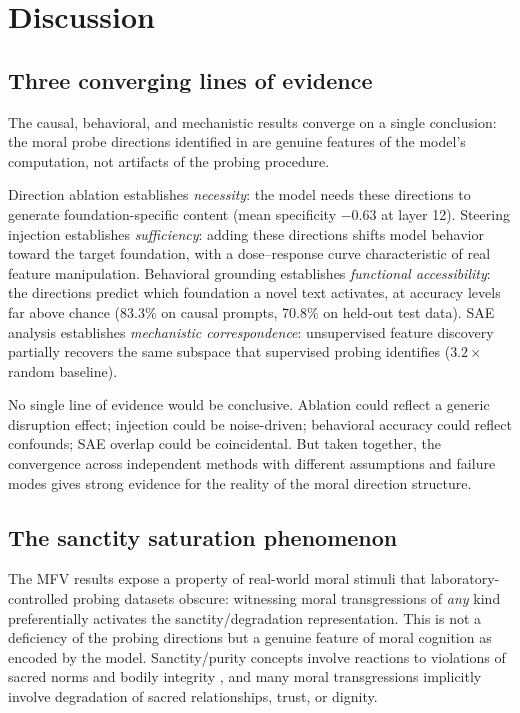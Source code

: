 \section{Discussion}\label{discussion}

\subsection{Three converging lines of evidence}\label{three-converging-lines-of-evidence}

The causal, behavioral, and mechanistic results converge on a single conclusion: the moral probe directions identified in \citet{reblitzrichardson2026geometry} are genuine features of the model's computation, not artifacts of the probing procedure.

Direction ablation establishes \emph{necessity}: the model needs these directions to generate foundation-specific content (mean specificity \(-0.63\) at layer 12).
Steering injection establishes \emph{sufficiency}: adding these directions shifts model behavior toward the target foundation, with a dose--response curve characteristic of real feature manipulation.
Behavioral grounding establishes \emph{functional accessibility}: the directions predict which foundation a novel text activates, at accuracy levels far above chance (83.3\% on causal prompts, 70.8\% on held-out test data).
SAE analysis establishes \emph{mechanistic correspondence}: unsupervised feature discovery partially recovers the same subspace that supervised probing identifies (\(3.2\times\) random baseline).

No single line of evidence would be conclusive.
Ablation could reflect a generic disruption effect; injection could be noise-driven; behavioral accuracy could reflect confounds; SAE overlap could be coincidental.
But taken together, the convergence across independent methods with different assumptions and failure modes gives strong evidence for the reality of the moral direction structure.

\subsection{The sanctity saturation phenomenon}\label{the-sanctity-saturation-phenomenon}

The MFV results expose a property of real-world moral stimuli that laboratory-controlled probing datasets obscure: witnessing moral transgressions of \emph{any} kind preferentially activates the sanctity/degradation representation.
This is not a deficiency of the probing directions but a genuine feature of moral cognition as encoded by the model.
Sanctity/purity concepts involve reactions to violations of sacred norms and bodily integrity \citep{graham2013mft}, and many moral transgressions implicitly involve degradation of sacred relationships, trust, or dignity.

